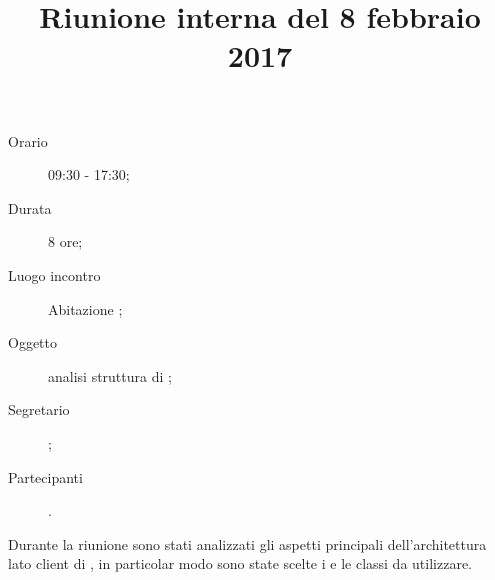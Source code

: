 


\author{\LS}
\supervisor{\LB}
\title{Riunione interna del 8 febbraio 2017}



\maketitle

\begin{description}
	\item[Orario] 09:30 - 17:30;
	\item[Durata] 8 ore;
	\item[Luogo incontro] Abitazione \LB;
	\item[Oggetto] analisi struttura  di \proj{};
	\item[Segretario] \LS; 
	\item[Partecipanti] \ALL.
\end{description}
Durante la riunione sono stati analizzati gli aspetti principali dell'architettura lato client di \proj{}, in particolar modo sono state scelte i  e le classi da utilizzare.


